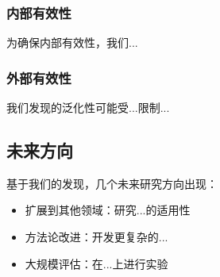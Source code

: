 \subsubsection{内部有效性}
为确保内部有效性，我们...

\subsubsection{外部有效性}
我们发现的泛化性可能受...限制...

\subsection{未来方向}

基于我们的发现，几个未来研究方向出现：

\begin{itemize}
    \item 扩展到其他领域：研究...的适用性
    \item 方法论改进：开发更复杂的...
    \item 大规模评估：在...上进行实验
\end{itemize}